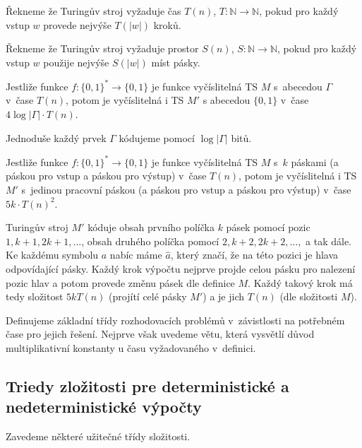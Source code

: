 \begin{definition}
Řekneme že Turingův stroj vyžaduje čas $T(n)$, $T : \mathbb{N} \to \mathbb{N}$,
pokud pro každý vstup $w$ provede nejvýše $T(\lvert w \rvert)$ kroků.

Řekneme že Turingův stroj vyžaduje prostor $S(n)$, $S : \mathbb{N} \to \mathbb{N}$,
pokud pro každý vstup $w$ použije nejvýše $S(\lvert w \rvert)$ míst
pásky.
\end{definition}

\begin{claim}
    Jestliže funkce $f : \{0, 1\}^* \to \{0, 1\}$ je funkce vyčíslitelná
    TS $M$ s~abecedou $\Gamma$ v~čase $T(n)$, potom je vyčíslitelná i
    TS $M'$ s abecedou $\{0,1\}$ v~čase $4 \log \lvert \Gamma \rvert
    \cdot T(n)$.
\end{claim}

Jednoduše každý prvek $\Gamma$ kódujeme pomocí $\log \lvert \Gamma
\rvert$ bitů.

\begin{claim}
    Jestliže funkce $f : \{0, 1\}^* \to \{0, 1\}$ je funkce vyčíslitelná
    TS $M$ s~$k$ páskami (a páskou pro vstup a páskou pro výstup) v~čase $T(n)$,
    potom je vyčíslitelná i TS $M'$ s~jedinou pracovní páskou (a páskou
    pro vstup a páskou pro výstup) v~čase
    $5 k \cdot T(n)^2$.
\end{claim}

Turingův stroj $M'$ kóduje obsah prvního políčka $k$ pásek pomocí pozic
$1, k+1, 2k+1,\ldots$, obsah druhého políčka pomocí $2, k+2,
2k+2,\ldots,$ a tak dále. Ke každému symbolu $a$ nabíc máme $\hat a$,
který značí, že na této pozici je hlava odpovídající pásky.
Každý krok výpočtu nejprve projde celou pásku pro nalezení pozic hlav
a potom provede změnu pásek dle definice $M$. Každý takový krok má tedy
složitost $5kT(n)$ (projítí celé pásky $M'$) a je jich $T(n)$ (dle složitosti $M$).

Definujeme základní třídy rozhodovacích problémů v~závistlosti
na potřebném čase pro jejich řešení. Nejprve však uvedeme větu, která
vysvětlí důvod multiplikativní konstanty u času vyžadovaného v~definici.

\subsection{Triedy zložitosti pre deterministické a nedeterministické výpočty}

Zavedeme některé užitečné třídy složitosti.


